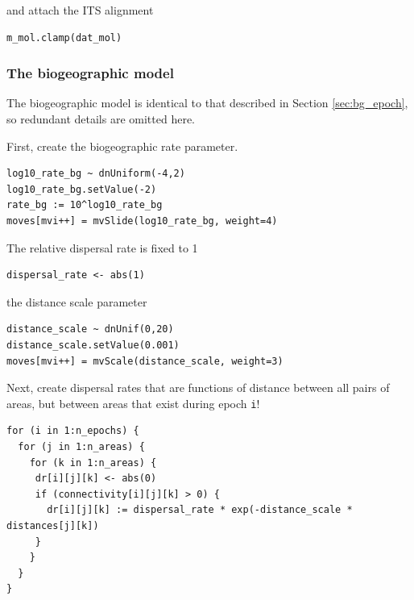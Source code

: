 and attach the ITS alignment

\begin{snugshade}
\begin{lstlisting}
m_mol.clamp(dat_mol)
\end{lstlisting}
\end{snugshade}


\subsubsection{The biogeographic model}

The biogeographic model is identical to that described in Section \ref{sec:bg_epoch}, so redundant details are omitted here.

First, create the biogeographic rate parameter.

\begin{snugshade}
\begin{lstlisting}
log10_rate_bg ~ dnUniform(-4,2)
log10_rate_bg.setValue(-2)
rate_bg := 10^log10_rate_bg
moves[mvi++] = mvSlide(log10_rate_bg, weight=4)
\end{lstlisting}
\end{snugshade}


The relative dispersal rate is fixed to 1
\begin{snugshade}
\begin{lstlisting}
dispersal_rate <- abs(1)
\end{lstlisting}
\end{snugshade}


the distance scale parameter

\begin{snugshade}
\begin{lstlisting}
distance_scale ~ dnUnif(0,20)
distance_scale.setValue(0.001)
moves[mvi++] = mvScale(distance_scale, weight=3)
\end{lstlisting}
\end{snugshade}


Next, create dispersal rates that are functions of distance between all pairs of areas, but between areas that exist during epoch {\tt i}!

\begin{snugshade}
\begin{lstlisting}
for (i in 1:n_epochs) {
  for (j in 1:n_areas) {
    for (k in 1:n_areas) {
     dr[i][j][k] <- abs(0)
     if (connectivity[i][j][k] > 0) {
       dr[i][j][k] := dispersal_rate * exp(-distance_scale * distances[j][k])
     }
    }
  }
}
\end{lstlisting}
\end{snugshade}


